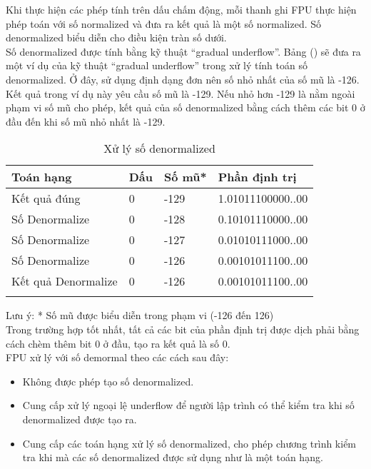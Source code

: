 	Khi thực hiện các phép tính trên dấu chấm động, mỗi thanh ghi FPU thực hiện phép toán với số normalized và đưa ra kết quả là một số normalized. Số denormalized biểu diễn cho điều kiện tràn số dưới.\\
	
	Số denormalized được tính bằng kỹ thuật “gradual underflow”. Bảng () sẽ đưa ra một ví dụ của kỹ thuật “gradual underflow” trong xử lý tính toán số denormalized. Ở đây, sử dụng định dạng đơn nên số nhỏ nhất của số mũ là -126. Kết quả trong ví dụ này yêu cầu số mũ là -129. Nếu nhỏ hơn -129 là nằm ngoài phạm vi số mũ cho phép, kết quả của số denormalized bằng cách thêm các bit 0 ở đầu đến khi số mũ nhỏ nhất là -129.\\
		
		\begin{longtable}{ | m{4cm} | m{2cm} |  m{2cm} | m{4cm} | }
			\hline
				Toán hạng & Dấu & Số mũ* & Phần định trị\\
			\hline
			\hline
				Kết quả đúng & 0 & -129 & 1.01011100000..00\\
			\hline
				Số Denormalize & 0 & -128 & 0.10101110000..00\\
			\hline
				Số Denormalize & 0 & -127 & 0.01010111000..00\\
			\hline
				Số Denormalize & 0 & -126 & 0.00101011100..00\\
			\hline
				Kết quả Denormalize & 0 & -126 & 0.00101011100..00\\
			\hline
			\caption{Xử lý số denormalized}
		\end{longtable}
		
	
	Lưu ý: * Số mũ được biểu diễn trong phạm vi (-126 đến 126)\\

	Trong trường hợp tốt nhất, tất cả các bit của phần định trị được dịch phải bằng cách chèm thêm bit 0 ở đầu, tạo ra kết quả là số 0.\\

FPU xử lý với số demormal theo các cách sau đây: 
	\begin{itemize}
			\renewcommand{\labelitemi}{\textbullet}	
			\item	Không được phép tạo số denormalized.
			\item	Cung cấp xử lý ngoại lệ underflow để người lập trình có thể kiểm tra khi số denormalized được tạo ra.
			\item	Cung cấp các toán hạng xử lý số denormalized, cho phép chương trình kiểm tra khi mà các số denormalized được sử dụng như là một toán hạng. 
	\end{itemize}

